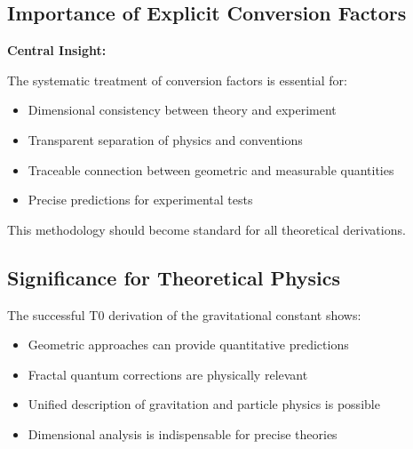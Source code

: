 	\subsection{Importance of Explicit Conversion Factors}
	
	\begin{keyresult}
		\textbf{Central Insight:}
		
		The systematic treatment of conversion factors is essential for:
		\begin{itemize}
			\item Dimensional consistency between theory and experiment
			\item Transparent separation of physics and conventions
			\item Traceable connection between geometric and measurable quantities
			\item Precise predictions for experimental tests
		\end{itemize}
		
		This methodology should become standard for all theoretical derivations.
	\end{keyresult}
	
	\subsection{Significance for Theoretical Physics}
	
	The successful T0 derivation of the gravitational constant shows:
	\begin{itemize}
		\item Geometric approaches can provide quantitative predictions
		\item Fractal quantum corrections are physically relevant
		\item Unified description of gravitation and particle physics is possible
		\item Dimensional analysis is indispensable for precise theories
	\end{itemize}
